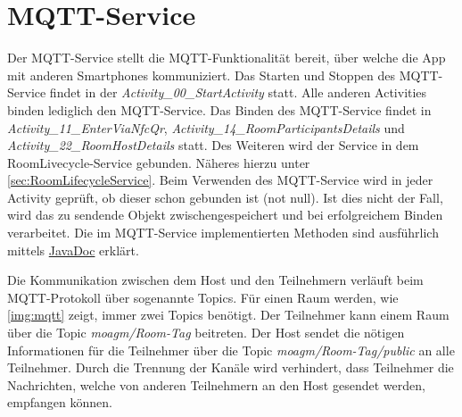 \section{MQTT-Service}
Der MQTT-Service stellt die MQTT-Funktionalität bereit, über welche die App mit anderen Smartphones kommuniziert.
Das Starten und Stoppen des MQTT-Service findet in der \textit{Activity\_00\_StartActivity} statt. Alle anderen Activities binden lediglich den MQTT-Service. Das Binden des MQTT-Service findet in  \textit{Activity\_11\_EnterViaNfcQr}, \textit{Activity\_14\_RoomParticipantsDetails} und \textit{Activity\_22\_RoomHostDetails} statt. Des Weiteren wird der Service in dem RoomLivecycle-Service gebunden. Näheres hierzu unter \cref{sec:RoomLifecycleService}.  Beim Verwenden des MQTT-Service wird in jeder Activity geprüft, ob dieser schon gebunden ist (not null). Ist dies nicht der Fall, wird das zu sendende Objekt zwischengespeichert und bei erfolgreichem Binden verarbeitet. 
Die im MQTT-Service implementierten Methoden sind ausführlich mittels \href{https://scm.inftech.hs-mannheim.de/gogs/moa/20moagm/src/dev/Doku/javadoc}{JavaDoc} erklärt. 

Die Kommunikation zwischen dem Host und den Teilnehmern verläuft beim MQTT-Protokoll über sogenannte Topics. Für einen Raum werden, wie \cref{img:mqtt} zeigt, immer zwei Topics benötigt. Der Teilnehmer kann einem Raum über die Topic \textit{moagm/Room-Tag} beitreten. Der Host sendet die nötigen Informationen für die Teilnehmer über die Topic \textit{moagm/Room-Tag/public} an alle Teilnehmer. Durch die Trennung der Kanäle wird verhindert, dass Teilnehmer die Nachrichten, welche von anderen Teilnehmern an den Host gesendet werden, empfangen können.

